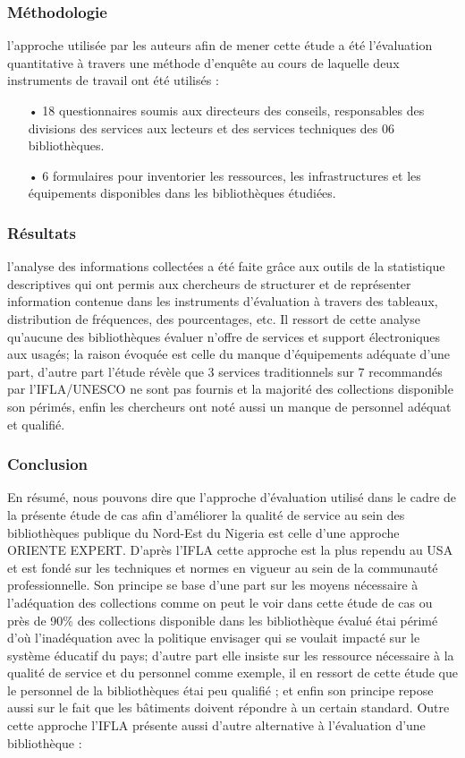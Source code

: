 \documentclass[french,a4paper,12pt]{article}
\begin{document}
{\subsubsection{Méthodologie}
\quad l'approche utilisée par les auteurs afin de mener cette étude a été l'évaluation quantitative à travers une méthode d'enquête au cours de laquelle deux instruments de travail ont été utilisés : 
\begin{enumerate}
\item[•]18 questionnaires soumis aux directeurs des conseils, responsables des divisions des services aux lecteurs et des services techniques des 06 bibliothèques.
\item[•]6 formulaires pour inventorier les ressources, les infrastructures et les équipements disponibles dans les bibliothèques étudiées.
\end{enumerate}

\subsubsection{Résultats}
\quad l'analyse des informations collectées a été faite grâce aux outils de la statistique descriptives qui ont permis aux chercheurs de structurer et de représenter information contenue dans les instruments d'évaluation à travers des tableaux, distribution de fréquences, des pourcentages, etc.
Il ressort de cette analyse qu'aucune des bibliothèques évaluer n'offre de services et support électroniques aux usagés; la raison évoquée est celle du manque d'équipements adéquate d'une part, d'autre part l'étude révèle que 3 services traditionnels sur 7 recommandés par l'IFLA/UNESCO ne sont pas fournis et la majorité des collections disponible son périmés, enfin les chercheurs ont noté aussi un manque de personnel adéquat et qualifié.\\
\subsubsection{Conclusion}
\quad En résumé, nous pouvons dire que l'approche d'évaluation utilisé dans le cadre de la présente étude de cas afin d'améliorer la qualité de service au sein des bibliothèques publique du Nord-Est du Nigeria est celle d'une approche ORIENTE EXPERT. D'après l'IFLA cette approche est la plus rependu au USA et est fondé sur les techniques et normes en vigueur au sein de la communauté professionnelle. Son principe se base d'une part sur les moyens nécessaire à l'adéquation des collections comme on peut le voir dans cette étude de cas ou près de 90\% des collections disponible dans les bibliothèque évalué étai périmé d'où l'inadéquation avec la politique envisager qui se voulait impacté sur le système éducatif du pays; d'autre part elle insiste sur les ressource nécessaire à la qualité de service et du personnel comme exemple, il en ressort de cette étude que le personnel de la bibliothèques étai peu qualifié ; et enfin son principe repose aussi sur le fait que les bâtiments doivent répondre à un certain standard. Outre cette approche l’IFLA présente aussi d'autre alternative à l'évaluation d'une bibliothèque\citep{noauthor_mesures_nodate} : 
\begin{enumerate}


\end{enumerate}}
\end{document}
